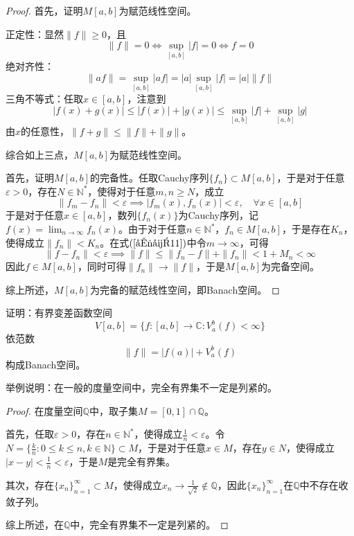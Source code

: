 \documentclass[lang = cn, scheme = chinese, 10pt]{elegantbook}
\newcommand{\N}{\mathbb{N}}  %
\newcommand{\C}{\mathbb{C}}  %
\newcommand{\Q}{\mathbb{Q}}  %
\newcommand{\sub}{\subset}   %
\begin{document}
\begin{proof}
	首先，证明$M[a,b]$为赋范线性空间。
	
	正定性：显然$\|f\|\ge 0$，且
	$$
	\|f\|=0\iff\sup_{[a,b]}|f|=0\iff f=0
	$$
	绝对齐性：
	$$
	\|af\|=\sup_{[a,b]}|af|=|a|\sup_{[a,b]}|f|=|a|\|f\|
	$$
	三角不等式：任取$x\in[a,b]$，注意到
	$$
	|f(x)+g(x)|\le |f(x)|+|g(x)|\le\sup_{[a,b]}|f|+\sup_{[a,b]}|g|
	$$
	由$x$的任意性，$\|f+g\|\le \|f\|+\|g\|$。
	
	综合如上三点，$M[a,b]$为赋范线性空间。
	
	首先，证明$M[a,b]$的完备性。任取Cauchy序列$\{f_n\}\sub M[a,b]$，于是对于任意$\varepsilon>0$，存在$N\in\N^*$，使得对于任意$m,n\ge N$，成立
	$$
	\label{公式11}\|f_m-f_n\|<\varepsilon \implies|f_m(x),f_n(x)|<\varepsilon,\quad \forall x\in[a,b]
	$$
	于是对于任意$x\in[a,b]$，数列$\{f_n(x)\}$为Cauchy序列，记$\displaystyle f(x)=\lim_{n\to\infty}f_n(x)$。由于对于任意$n\in\N^*$，$f_n\in M[a,b]$，于是存在$K_n$，使得成立$\|f_n\|<K_n$。在式$(\ref{公式11})$中令$m\to\infty$，可得
	$$
	\|f-f_n\|<\varepsilon\implies\|f\|\le \|f_n-f\|+\|f_n\|<1+M_n<\infty
	$$
	因此$f\in M[a,b]$，同时可得$\|f_n\|\to\|f\|$，于是$M[a,b]$为完备空间。
	
	综上所述，$M[a,b]$为完备的赋范线性空间，即Banach空间。
\end{proof}

\begin{proposition}
	证明：有界变差函数空间
	$$
	V[a,b]=\{ f:[a,b]\to \C:V_a^b(f)<\infty \}
	$$
	依范数
	$$
	\|f\|=|f(a)|+V_a^b(f)
	$$
	构成Banach空间。
\end{proposition}

\begin{proposition}
	举例说明：在一般的度量空间中，完全有界集不一定是列紧的。
\end{proposition}

\begin{proof}
	在度量空间$\Q$中，取子集$M=[0,1]\cap\Q$。
	
	首先，任取$\varepsilon>0$，存在$n\in\N^*$，使得成立$\frac{1}{n}<\varepsilon$。令$N=\{ \frac{k}{n}:0\le k\le n,k\in\N \}\sub M$，于是对于任意$x\in M$，存在$y\in N$，使得成立$|x-y|<\frac{1}{n}<\varepsilon$，于是$M$是完全有界集。
	
	其次，存在$\{x_n\}_{n=1}^{\infty}\sub M$，使得成立$x_n\to \frac{1}{\sqrt{2}}\notin \Q$，因此$\{x_n\}_{n=1}^{\infty}$在$\Q$中不存在收敛子列。
	
	综上所述，在$\Q$中，完全有界集不一定是列紧的。
\end{proof}
\end{document}
